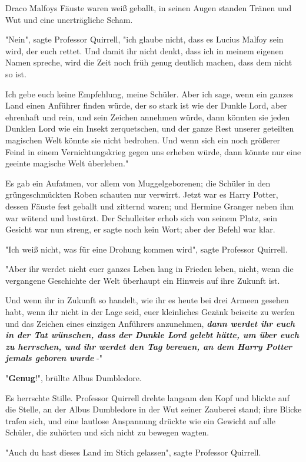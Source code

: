 {Draco Malfoys Fäuste waren weiß geballt, in seinen Augen standen Tränen und Wut und eine unerträgliche Scham.

"Nein", sagte Professor Quirrell, "ich glaube nicht, dass es Lucius Malfoy sein wird, der euch rettet. Und damit ihr nicht denkt, dass ich in meinem eigenen Namen spreche, wird die Zeit noch früh genug deutlich machen, dass dem nicht so ist.

Ich gebe euch keine Empfehlung, meine Schüler. Aber ich sage, wenn ein ganzes Land einen Anführer finden würde, der so stark ist wie der Dunkle Lord, aber ehrenhaft und rein, und sein Zeichen annehmen würde, dann könnten sie jeden Dunklen Lord wie ein Insekt zerquetschen, und der ganze Rest unserer geteilten magischen Welt könnte sie nicht bedrohen. Und wenn sich ein noch größerer Feind in einem Vernichtungskrieg gegen uns erheben würde, dann könnte nur eine geeinte magische Welt überleben."

Es gab ein Aufatmen, vor allem von Muggelgeborenen; die Schüler in den grüngeschmückten Roben schauten nur verwirrt. Jetzt war es Harry Potter, dessen Fäuste fest geballt und zitternd waren; und Hermine Granger neben ihm war wütend und bestürzt. Der Schulleiter erhob sich von seinem Platz, sein Gesicht war nun streng, er sagte noch kein Wort; aber der Befehl war klar.

"Ich weiß nicht, was für eine Drohung kommen wird", sagte Professor Quirrell.

"Aber ihr werdet nicht euer ganzes Leben lang in Frieden leben, nicht, wenn die vergangene Geschichte der Welt überhaupt ein Hinweis auf ihre Zukunft ist.

Und wenn ihr in Zukunft so handelt, wie ihr es heute bei drei Armeen gesehen habt, wenn ihr nicht in der Lage seid, euer kleinliches Gezänk beiseite zu werfen und das Zeichen eines einzigen Anführers anzunehmen, \textbf{\emph{dann werdet ihr euch in der Tat wünschen, dass der Dunkle Lord gelebt hätte, um über euch zu herrschen, und ihr werdet den Tag bereuen, an dem Harry Potter jemals geboren wurde}} -"

"\textbf{Genug}!", brüllte Albus Dumbledore.

Es herrschte Stille. Professor Quirrell drehte langsam den Kopf und blickte auf die Stelle, an der Albus Dumbledore in der Wut seiner Zauberei stand; ihre Blicke trafen sich, und eine lautlose Anspannung drückte wie ein Gewicht auf alle Schüler, die zuhörten und sich nicht zu bewegen wagten.

"Auch du hast dieses Land im Stich gelassen", sagte Professor Quirrell.

}
